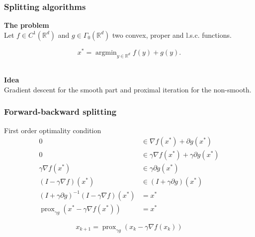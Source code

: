 \documentclass[aspectratio=169]{beamer}
\DeclareMathOperator{\Prox}{prox}
\newcommand{\prox}[2]{\Prox_{#1}\left({#2}\right)}
\newcommand{\rd}{\mathbb{R}^d}
\DeclareMathOperator*{\argmin}{argmin}
\begin{document}
		\begin{frame}
		\frametitle{Splitting algorithms}
		\begin{center}
		\textbf{The problem}
		\quad \\		
		Let $f\in C^1(\rd)$ and $g\in\Gamma_0\left(\rd\right)$ two convex, proper and l.s.c. functions.
		\end{center}
		\begin{equation}
		\nonumber
		x^* = \argmin_{y\in\rd} f(y) + g(y).
		\end{equation}
		\quad \\
		
		\pause
		\begin{center}
		\textbf{Idea}
		\quad \\
		Gradient descent for the smooth part and proximal iteration for the non-smooth.
		\end{center}
		\end{frame}
		
		\begin{frame}
		\frametitle{Forward-backward splitting}
		First order optimality condition
		\begin{align}
		\nonumber 0 &\in \nabla f\left(x^*\right) + \partial g \left(x^*\right)\\
		\nonumber 0 &\in \gamma \nabla f\left(x^*\right) + \gamma \partial g \left(x^*\right)\\
		\nonumber \gamma\nabla f \left(x^*\right) &\in \gamma\partial g \left(x^*\right)\\
		\nonumber \left(I-\gamma\nabla f\right) \left(x^*\right) &\in \left(I+\gamma\partial g\right) \left(x^*\right)\\
		\nonumber \left(I+\gamma \partial g\right)^{-1} \left(I-\gamma\nabla f\right) \left(x^*\right) &= x^*\\
		\nonumber \prox{\gamma g}{x^* - \gamma\nabla f\left(x^*\right)} &= x^*
		\end{align}
		
		\pause
		
		\begin{equation}
		\nonumber x_{k+1} = \prox{\gamma g}{x_k - \gamma\nabla f\left(x_k\right)}
		\end{equation}
		\end{frame}
		
\end{document}
